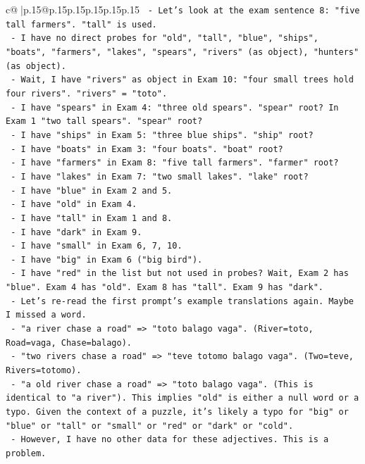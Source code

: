 \documentclass{article}
\begin{document}
{\begin{supertabular}{c@{$\;$}|p{.15\linewidth}@{}p{.15\linewidth}p{.15\linewidth}p{.15\linewidth}p{.15\linewidth}p{.15\linewidth}}
{{{\texttt{  {-} Let's look at the exam sentence 8: "five tall farmers". "tall" is used.} \\
\texttt{  {-} I have no direct probes for "old", "tall", "blue", "ships", "boats", "farmers", "lakes", "spears", "rivers" (as object), "hunters" (as object).} \\
\texttt{  {-} Wait, I have "rivers" as object in Exam 10: "four small trees hold four rivers". "rivers" = "toto".} \\
\texttt{  {-} I have "spears" in Exam 4: "three old spears". "spear" root? In Exam 1 "two tall spears". "spear" root?} \\
\texttt{  {-} I have "ships" in Exam 5: "three blue ships". "ship" root?} \\
\texttt{  {-} I have "boats" in Exam 3: "four boats". "boat" root?} \\
\texttt{  {-} I have "farmers" in Exam 8: "five tall farmers". "farmer" root?} \\
\texttt{  {-} I have "lakes" in Exam 7: "two small lakes". "lake" root?} \\
\texttt{  {-} I have "blue" in Exam 2 and 5.} \\
\texttt{  {-} I have "old" in Exam 4.} \\
\texttt{  {-} I have "tall" in Exam 1 and 8.} \\
\texttt{  {-} I have "dark" in Exam 9.} \\
\texttt{  {-} I have "small" in Exam 6, 7, 10.} \\
\texttt{  {-} I have "big" in Exam 6 ("big bird").} \\
\texttt{  {-} I have "red" in the list but not used in probes? Wait, Exam 2 has "blue". Exam 4 has "old". Exam 8 has "tall". Exam 9 has "dark".} \\
\texttt{  {-} Let's re{-}read the first prompt's example translations again. Maybe I missed a word.} \\
\texttt{  {-} "a river chase a road" => "toto balago vaga". (River=toto, Road=vaga, Chase=balago).} \\
\texttt{  {-} "two rivers chase a road" => "teve totomo balago vaga". (Two=teve, Rivers=totomo).} \\
\texttt{  {-} "a old river chase a road" => "toto balago vaga". (This is identical to "a river"). This implies "old" is either a null word or a typo. Given the context of a puzzle, it's likely a typo for "big" or "blue" or "tall" or "small" or "red" or "dark" or "cold".} \\
\texttt{  {-} However, I have no other data for these adjectives. This is a problem.} \\
}}}
\end{supertabular}}
\end{document}
